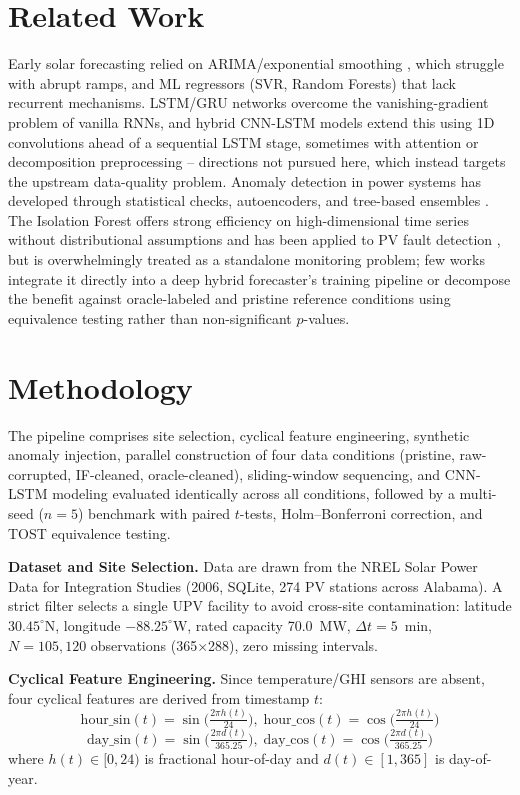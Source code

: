 \documentclass[runningheads]{llncs}
\begin{document}
\section{Related Work}
Early solar forecasting relied on ARIMA/exponential smoothing \cite{ref9}, which struggle with abrupt ramps, and ML regressors (SVR, Random Forests) \cite{ref10} that lack recurrent mechanisms. LSTM/GRU networks \cite{ref1} overcome the vanishing-gradient problem of vanilla RNNs, and hybrid CNN-LSTM models \cite{ref4,ref5,ref6,ref7,ref11} extend this using 1D convolutions ahead of a sequential LSTM stage, sometimes with attention \cite{ref6,ref11} or decomposition preprocessing \cite{ref7} -- directions not pursued here, which instead targets the upstream data-quality problem. Anomaly detection in power systems has developed through statistical checks, autoencoders, and tree-based ensembles \cite{ref8}. The Isolation Forest \cite{ref12} offers strong efficiency on high-dimensional time series without distributional assumptions and has been applied to PV fault detection \cite{ref13}, but is overwhelmingly treated as a standalone monitoring problem; few works integrate it directly into a deep hybrid forecaster's training pipeline or decompose the benefit against oracle-labeled and pristine reference conditions using equivalence testing rather than non-significant $p$-values.

\section{Methodology}
The pipeline comprises site selection, cyclical feature engineering, synthetic anomaly injection, parallel construction of four data conditions (pristine, raw-corrupted, IF-cleaned, oracle-cleaned), sliding-window sequencing, and CNN-LSTM modeling evaluated identically across all conditions, followed by a multi-seed ($n=5$) benchmark with paired $t$-tests, Holm--Bonferroni correction, and TOST equivalence testing.

\noindent\textbf{Dataset and Site Selection.} Data are drawn from the NREL Solar Power Data for Integration Studies (2006, SQLite, 274 PV stations across Alabama). A strict filter selects a single UPV facility to avoid cross-site contamination: latitude $30.45^\circ$N, longitude $-88.25^\circ$W, rated capacity 70.0~MW, $\Delta t=5$~min, $N=105{,}120$ observations (365$\times$288), zero missing intervals.

\noindent\textbf{Cyclical Feature Engineering.} Since temperature/GHI sensors are absent, four cyclical features are derived from timestamp $t$:
\begin{equation}
\text{hour\_sin}(t)=\sin\!\Big(\tfrac{2\pi h(t)}{24}\Big),\;
\text{hour\_cos}(t)=\cos\!\Big(\tfrac{2\pi h(t)}{24}\Big)
\end{equation}
\begin{equation}
\text{day\_sin}(t)=\sin\!\Big(\tfrac{2\pi d(t)}{365.25}\Big),\;
\text{day\_cos}(t)=\cos\!\Big(\tfrac{2\pi d(t)}{365.25}\Big)
\end{equation}
where $h(t)\in[0,24)$ is fractional hour-of-day and $d(t)\in[1,365]$ is day-of-year.
\end{document}
